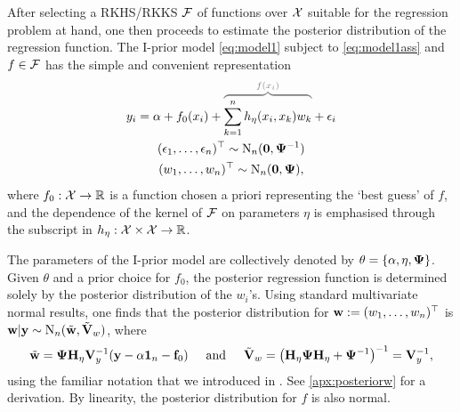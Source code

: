 After selecting a RKHS/RKKS ${\mathcal F}$ of functions over ${\mathcal X}$ suitable for the regression problem at hand, one then proceeds to estimate the posterior distribution of the regression function.
The I-prior model \eqref{eq:model1} subject to \eqref{eq:model1ass} and $f\in{\mathcal F}$ has the simple and convenient representation
\begin{align}\label{eq:model2}
  \begin{gathered}
    y_i = \alpha + f_0(x_i) +
    {\color{gray}
    \overbrace{\color{black}
    \sum_{k=1}^n h_\eta(x_i,x_k)w_k 
    }^{f(x_i)}
    }
    + \epsilon_i \\
    (\epsilon_1,\dots,\epsilon_n)^\top \sim \N_n(\bzero, \bPsi^{-1}) \\
    (w_1,\dots,w_n)^\top \sim \N_n(\bzero,\bPsi),
  \end{gathered}
\end{align}
where $f_0:{\mathcal X}\to\mathbb{R}$ is a function chosen a priori representing the `best guess' of $f$, and the dependence of the kernel of ${\mathcal F}$ on parameters $\eta$ is emphasised through the subscript in $h_\eta:{\mathcal X}\times{\mathcal X}\to\mathbb{R}$.

The parameters of the I-prior model are collectively denoted by $\theta = \{\alpha,\eta,{\bm\Psi} \}$.
Given $\theta$ and a prior choice for $f_0$, the posterior regression function is determined solely by the posterior distribution of the $w_i$'s.
Using standard multivariate normal results, one finds that the posterior distribution for ${\mathbf w} := (w_1,\dots,w_n)^\top$ is ${\mathbf w}|{\mathbf y} \sim \operatorname{N}_n(\tilde{\mathbf w}, \tilde{{\mathbf V}}_w )$, where
\begin{align}\label{eq:posteriorw}
  \begin{gathered}
    \tilde{\mathbf w} = {\bm\Psi} {\mathbf H}_\eta {\mathbf V}_y^{-1} ({\mathbf y} - \alpha{\mathbf 1}_n - {\mathbf f}_0)
    \hspace{0.5cm}\text{and}\hspace{0.5cm}
    \tilde{{\mathbf V}}_w = \big({\mathbf H}_\eta{\bm\Psi}{\mathbf H}_\eta + {\bm\Psi}^{-1}\big)^{-1} = {\mathbf V}_y^{-1},
  \end{gathered}
\end{align}
using the familiar notation that we introduced in .
See \autoref{apx:posteriorw} for a derivation.
By linearity, the posterior distribution for $f$ is also normal.

